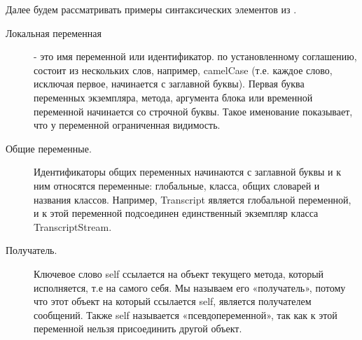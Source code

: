 \documentclass[a4paper,10pt,twoside]{book}
\begin{document}
Далее будем рассматривать примеры синтаксических элементов из .
\begin{description}
\item[Локальная переменная]	 - это имя переменной или идентификатор.
		по установленному соглашению, состоит из нескольких слов, например, camelCase  (т.е. каждое слово, исключая первое, начинается с заглавной буквы).
		Первая буква переменных экземпляра, метода, аргумента блока или временной переменной начинается со строчной буквы.
		Такое именование показывает, что у переменной ограниченная видимость.

\item[Общие переменные.]	Идентификаторы общих переменных начинаются с заглавной буквы и к ним относятся переменные: глобальные, класса, общих словарей и названия классов.
		Например, Transcript является глобальной переменной, и к этой переменной подсоединен единственный экземпляр класса TranscriptStream.

\item[Получатель.]	Ключевое слово self ссылается на объект текущего метода, который исполняется, т.е на самого себя.
		Мы называем его «получатель», потому что этот объект на который ссылается self, является получателем сообщений.
		Также self называется «псевдопеременной», так как к этой переменной нельзя присоединить другой объект.


\end{description}
\end{document}
